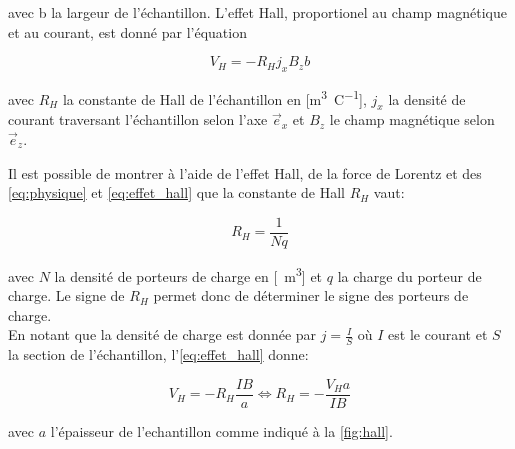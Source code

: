 \begin{minipage}{\textwidth}
    avec b la largeur de l'échantillon. L'effet Hall, proportionel au champ magnétique et au courant, est donné par l'équation

    \begin{equation}
        V_H = -R_H j_x B_z b
        \label{eq:effet_hall}
    \end{equation}

    avec \(R_H\) la constante de Hall de l'échantillon en [\si{\meter\cubed\per\coulomb}], \(j_x\) la densité de courant traversant l'échantillon selon l'axe \(\vec{e}_x\) et \(B_z\) le champ magnétique selon \(\vec{e}_z\). \cite{notice}
\end{minipage}

Il est possible de montrer à l'aide de l'effet Hall, de la force de Lorentz et des \autoref{eq:physique} et \autoref{eq:effet_hall} que la constante de Hall \(R_H\) vaut:

\begin{equation}
    R_H = \frac{1}{Nq}
    \label{eq:N}
\end{equation}

avec \(N\) la densité de porteurs de charge en [\si{\per\meter\cubed}] et \(q\) la charge du porteur de charge. Le signe de \(R_H\) permet donc de déterminer le signe des porteurs de charge.\\
En notant que la densité de charge est donnée par \(j = \frac{I}{S}\) où \(I\) est le courant et \(S\) la section de l'échantillon, l'\autoref{eq:effet_hall} donne:

\begin{equation}
    V_H = -R_H \frac{IB}{a} \iff R_H = -\frac{V_H a}{IB}
    \label{eq:R_H}
\end{equation}

avec \(a\) l'épaisseur de l'echantillon comme indiqué à la \autoref{fig:hall}.
